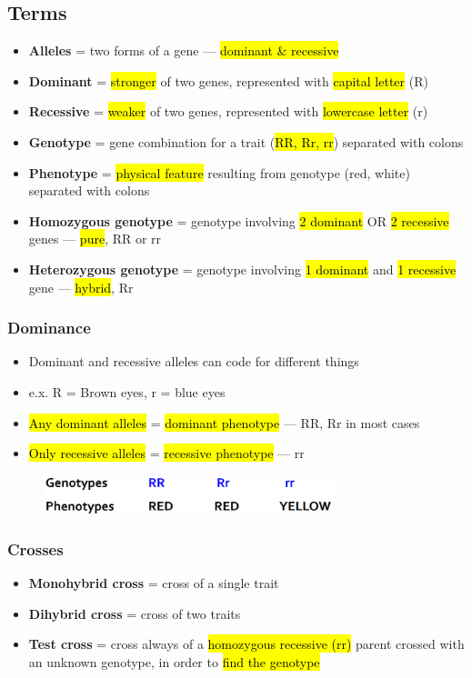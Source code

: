 \documentclass[a4paper,12pt]{article}
\begin{document}
\subsection{Terms}
\begin{itemize}
    \item{\textbf{Alleles} = two forms of a gene --- \hl{dominant \& recessive}}
    \item{\textbf{Dominant} = \hl{stronger} of two genes, represented with \hl{capital letter} (R)}
    \item{\textbf{Recessive} = \hl{weaker} of two genes, represented with \hl{lowercase letter} (r)}
    \item{\textbf{Genotype} = gene combination for a trait (\hl{RR, Rr, rr}) separated with colons}
    \item{\textbf{Phenotype} = \hl{physical feature} resulting from genotype (red, white) separated with colons}
    \item{\textbf{Homozygous genotype} = genotype involving \hl{2 dominant} OR \hl{2 recessive} genes --- \hl{pure}, RR or rr}
    \item{\textbf{Heterozygous genotype} = genotype involving \hl{1 dominant} and \hl{1 recessive} gene --- \hl{hybrid}, Rr}
\end{itemize}

\pagebreak

\subsubsection{Dominance}
\begin{itemize}
    \item{Dominant and recessive alleles can code for different things}
    \item{e.x. R = Brown eyes, r = blue eyes}
    \item{\hl{Any dominant alleles} = \hl{dominant phenotype} --- RR, Rr in most cases}
    \item{\hl{Only recessive alleles} = \hl{recessive phenotype} --- rr}
\end{itemize}

\begin{figure}[H]
    \centering
    \includegraphics[width=0.75\textwidth]{dom}
\end{figure}

\subsubsection{Crosses}
\begin{itemize}
    \item{\textbf{Monohybrid cross} = cross of a single trait}
    \item{\textbf{Dihybrid cross} = cross of two traits}
    \item{\textbf{Test cross} = cross always of a \hl{homozygous recessive (rr)} parent crossed with an unknown genotype, in order to \hl{find the genotype}}
\end{itemize}
\end{document}

